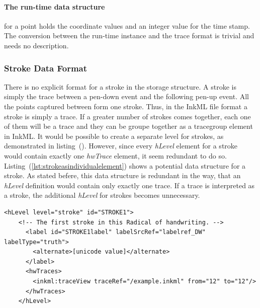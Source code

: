 \paragraph{The run-time data structure} for a point holds the coordinate values 
and an integer value for the time stamp. The conversion between the run-time 
instance and the trace format is trivial and needs no description.

\subsubsection{Stroke Data Format}
\label{sec:hwre:strokedataformat}

There is no explicit format for a stroke in the storage structure.
A stroke is simply the trace between a pen-down event and the following pen-up
event. All the points captured between form one stroke.
Thus, in the InkML file format a stroke is simply a trace.
If a greater number of strokes comes together, each one of them will be a trace
and they can be groupe together as a tracegroup element in InkML.
It would be possible to create a separate level for strokes, as demonstrated
in listing~(). However, since every \emph{hLevel} element for a stroke would 
contain exactly one \emph{hwTrace} element, it seem redundant to do so.
Listing~(\ref{lst:strokeasindividualelement}) shows a potential data structure
for a stroke. As stated befere, this data structure is redundant in the way, 
that an \emph{hLevel} definition would contain only exactly one trace.
If a trace is interpreted as a stroke, the additional \emph{hLevel} for strokes
becomes unnecessary.

\begin{xmlcode}
  \begin{lstlisting}[emph={hLevel,hwTraces,label,alternative},
                     emphstyle=\color{blue}\textbf,
                     emph={[2]level,labelSrcRef,labelType,traceRef,from,to},
                     emphstyle={[2]\color{red}},
                     caption={An example of how a stroke could be 
                              represented in UPX},
                     label=lst:strokeasindividualelement]
    <hLevel level="stroke" id="STROKE1">
    <!-- The first stroke in this Radical of handwriting. -->
      <label id="STROKE1label" labelSrcRef="labelref_DW" labelType="truth">
        <alternate>[unicode value]</alternate>
      </label>
      <hwTraces>
        <inkml:traceView traceRef="/example.inkml" from="12" to="12"/>
      </hwTraces>
    </hLevel>
  \end{lstlisting}
\end{xmlcode}

